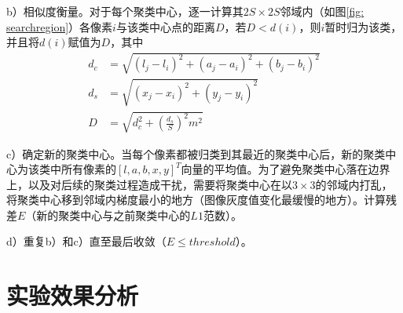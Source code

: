 \documentclass[12pt]{article}
\begin{document}
b）相似度衡量。对于每个聚类中心，逐一计算其$2S \times 2S$邻域内（如图\ref{fig: searchregion}）各像素$i$与该类中心点的距离$D$，若$D<d(i)$，则$i$暂时归为该类，并且将$d(i)$赋值为$D$，其中
\begin{align}
d_c & =  \sqrt{(l_j-l_i)^2+(a_j-a_i)^2+(b_j-b_i)^2}\\
d_s & =  \sqrt{(x_j-x_i)^2+(y_j-y_i)^2}\\
D & =  \sqrt{d_c^2+\left(\frac{d_s}{S}\right)^2m^2}
\end{align}

c）确定新的聚类中心。当每个像素都被归类到其最近的聚类中心后，新的聚类中心为该类中所有像素的$[l, a, b, x, y]^T$向量的平均值。为了避免聚类中心落在边界上，以及对后续的聚类过程造成干扰，需要将聚类中心在以$3\times3$的邻域内打乱，将聚类中心移到邻域内梯度最小的地方（图像灰度值变化最缓慢的地方）。计算残差$E$（新的聚类中心与之前聚类中心的$L1$范数）。

d）重复b）和c）直至最后收敛（$E\le threshold$）。

\section{实验效果分析}






\end{document}
